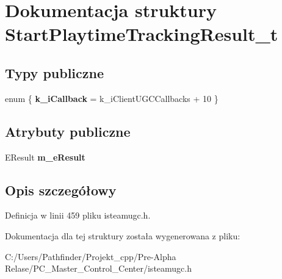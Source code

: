 \hypertarget{struct_start_playtime_tracking_result__t}{}\section{Dokumentacja struktury Start\+Playtime\+Tracking\+Result\+\_\+t}
\label{struct_start_playtime_tracking_result__t}
\subsection*{Typy publiczne}
\begin{DoxyCompactItemize}
\item 
\mbox{\label{struct_start_playtime_tracking_result__t_a630a32c5721d3b573f44cdffb38c69ff}} 
enum \{ {\bfseries k\+\_\+i\+Callback} = k\+\_\+i\+Client\+U\+G\+C\+Callbacks + 10
 \}
\end{DoxyCompactItemize}
\subsection*{Atrybuty publiczne}
\begin{DoxyCompactItemize}
\item 
\mbox{\label{struct_start_playtime_tracking_result__t_a06652383b544021701e7721fe170791e}} 
E\+Result {\bfseries m\+\_\+e\+Result}
\end{DoxyCompactItemize}


\subsection{Opis szczegółowy}


Definicja w linii 459 pliku isteamugc.\+h.



Dokumentacja dla tej struktury została wygenerowana z pliku\+:\begin{DoxyCompactItemize}
\item 
C\+:/\+Users/\+Pathfinder/\+Projekt\+\_\+cpp/\+Pre-\/\+Alpha Relase/\+P\+C\+\_\+\+Master\+\_\+\+Control\+\_\+\+Center/isteamugc.\+h\end{DoxyCompactItemize}
